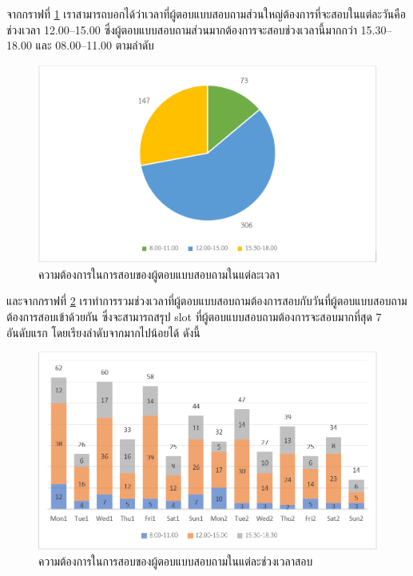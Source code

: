 จากกราฟที่ \ref{fig:time} เราสามารถบอกได้ว่าเวลาที่ผู้ตอบแบบสอบถามส่วนใหญ่ต้องการที่จะสอบในแต่ละวันคือ
ช่วงเวลา 12.00--15.00 ซึ่งผู้ตอบแบบสอบถามส่วนมากต้องการจะสอบช่วงเวลานี้มากกว่า 15.30--18.00 และ 08.00--11.00 ตามลำดับ
\begin{figure}
  \begin{center}
    \includegraphics[width=\linewidth]{images/pie_chart_for_final_exam_time.png}
  \end{center}
  \caption{ความต้องการในการสอบของผู้ตอบแบบสอบถามในแต่ละเวลา}
  \label{fig:time}
\end{figure}
และจากกราฟที่ \ref{fig:time_slot} เราทำการรวมช่วงเวลาที่ผู้ตอบแบบสอบถามต้องการสอบกับวันที่ผู้ตอบแบบสอบถามต้องการสอบเข้าด้วยกัน ซึ่งจะสามารถสรุป slot ที่ผู้ตอบแบบสอบถามต้องการจะสอบมากที่สุด 7 อันดับแรก โดยเรียงลำดับจากมากไปน้อยได้ ดังนี้
\begin{figure}
  \begin{center}
    \includegraphics[width=\linewidth]{images/bar_chart_for_final_exam_slot.png}
  \end{center}
  \caption[ความต้องการในการสอบของผู้ตอบแบบสอบถามในแต่ละช่วงเวลาสอบ]{ความต้องการในการสอบของผู้ตอบแบบสอบถามในแต่ละช่วงเวลาสอบ}
  \label{fig:time_slot}     
\end{figure}
